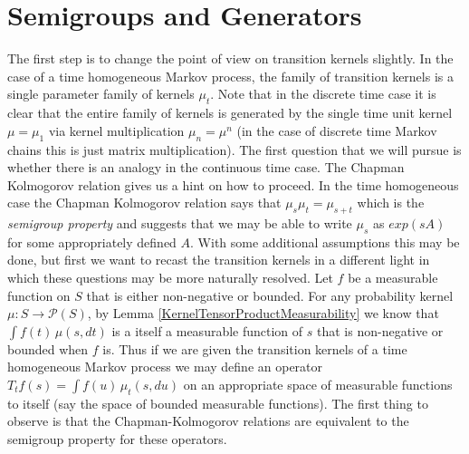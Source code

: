 \section{Semigroups and Generators}

The first step is to change the point of view on transition kernels
slightly.  In the case of a time homogeneous Markov process, the
family of transition kernels is a single parameter family of kernels
$\mu_t$.  Note that in the discrete time case it is clear that the
entire family of kernels is generated by the single time unit kernel
$\mu = \mu_1$ via kernel multiplication $\mu_n = \mu^{n}$ (in
the case of discrete time Markov chains this is just matrix multiplication).  The
first question that we will pursue is whether there is an analogy in
the continuous time case.  The Chapman Kolmogorov relation gives us a
hint on how to proceed.  In the time homogeneous case the Chapman
Kolmogorov relation says that $\mu_s \mu_t = \mu_{s+t}$ which is the
\emph{semigroup property} and suggests that we may be able to write
$\mu_s$ as $exp(s A)$ for some appropriately defined $A$.  With
some additional assumptions this may be done, but first we want to
recast the transition kernels in a different light in which these
questions may be more naturally resolved.  Let $f$ be a measurable
function on $S$ that is either non-negative or bounded.  For any
probability kernel $\mu : S \to \mathcal{P}(S)$, by
Lemma \ref{KernelTensorProductMeasurability} we know that $\int f(t)
\, \mu(s,dt)$ is a itself a measurable function of $s$ that is non-negative
or bounded when $f$ is.  Thus if we are given the transition kernels
of a time homogeneous Markov process we may define an operator $T_tf
(s) = \int f(u) \, \mu_t(s, du)$ on an appropriate space of measurable
functions to itself (say the space of bounded measurable functions).  The first thing to observe is that the
Chapman-Kolmogorov relations are equivalent to the semigroup property
for these operators.

